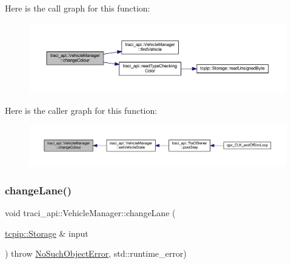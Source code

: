 Here is the call graph for this function\+:
\nopagebreak
\begin{figure}[H]
\begin{center}
\leavevmode
\includegraphics[width=350pt]{classtraci__api_1_1_vehicle_manager_a6829e259033dcd95611755953f164ef0_cgraph}
\end{center}
\end{figure}
Here is the caller graph for this function\+:
\nopagebreak
\begin{figure}[H]
\begin{center}
\leavevmode
\includegraphics[width=350pt]{classtraci__api_1_1_vehicle_manager_a6829e259033dcd95611755953f164ef0_icgraph}
\end{center}
\end{figure}
\mbox{\label{classtraci__api_1_1_vehicle_manager_a5441f5ea01a06473f831ac85b9a6c70f}} 
\subsubsection{\texorpdfstring{change\+Lane()}{changeLane()}}
{\footnotesize\ttfamily void traci\+\_\+api\+::\+Vehicle\+Manager\+::change\+Lane (\begin{DoxyParamCaption}\item[{\hyperlink{classtcpip_1_1_storage}{tcpip\+::\+Storage} \&}]{input }\end{DoxyParamCaption}) throw  \hyperlink{classtraci__api_1_1_no_such_object_error}{No\+Such\+Object\+Error}, std\+::runtime\+\_\+error) }

